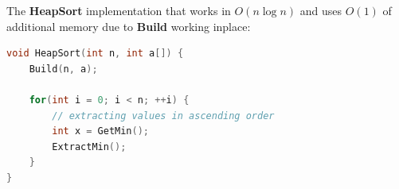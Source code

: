The \textbf{HeapSort} implementation that works in $O(n \log{n})$ and uses $O(1)$ of additional memory due to \textbf{Build} working inplace:

\begin{lstlisting}[language=C++]
void HeapSort(int n, int a[]) {
    Build(n, a);

    for(int i = 0; i < n; ++i) {
        // extracting values in ascending order
        int x = GetMin();
        ExtractMin();
    }
}
\end{lstlisting}
